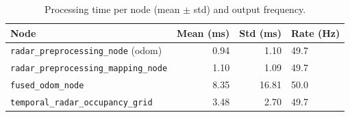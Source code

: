\begin{table}[htbp]
    \centering
    \caption{Processing time per node (mean $\pm$ std) and output frequency.}
    \label{tab:perf}
    \begin{tabular}{lrrl}
        \toprule
        Node & Mean (ms) & Std (ms) & Rate (Hz) \\
        \midrule
        \texttt{radar\_preprocessing\_node} (odom) & 0.94 & 1.10 & 49.7 \\
        \texttt{radar\_preprocessing\_mapping\_node} & 1.10 & 1.09 & 49.7 \\
        \texttt{fused\_odom\_node} & 8.35 & 16.81 & 50.0 \\
        \texttt{temporal\_radar\_occupancy\_grid} & 3.48 & 2.70 & 49.7 \\
        \bottomrule
    \end{tabular}
\end{table}
